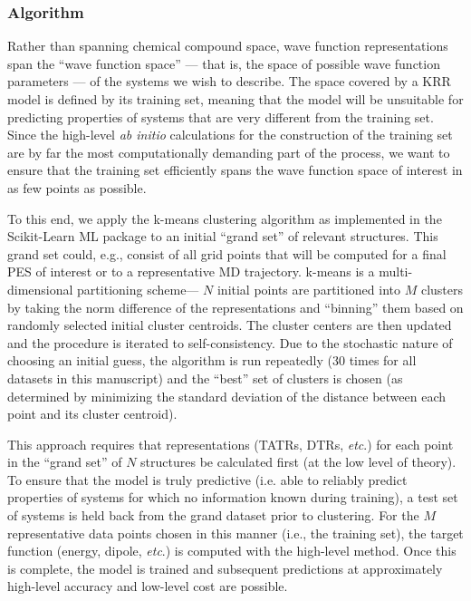 \subsubsection{Algorithm} \label{algorithm}
Rather than spanning chemical compound space, wave function representations span the ``wave function space'' --- that is, the space of possible wave function parameters --- of the systems we wish to describe. The space covered by a KRR model is defined by its training set, meaning that the model will be unsuitable for predicting properties of systems that are very different from the training set. Since the high-level \emph{ab initio} calculations for the construction of the training set are by far the most computationally demanding part of the process, we want to ensure that the training set efficiently spans the wave function space of interest in as few points as possible. 

To this end, we apply the k-means clustering algorithm as implemented in the Scikit-Learn ML package\cite{Pedregosa2011} to an initial ``grand set'' of relevant structures. This grand set could, e.g., consist of all grid points that will be computed for a final PES of interest or to a representative MD trajectory. k-means is a multi-dimensional partitioning scheme--- $N$ initial points are partitioned into $M$ clusters by taking the norm difference of the representations and ``binning'' them based on randomly selected initial cluster centroids. 
The cluster centers are then updated and the procedure is iterated to self-consistency. Due to the stochastic nature of choosing an initial guess, the algorithm is run repeatedly (30 times for all datasets in this manuscript) and the ``best'' set of clusters is chosen (as determined by minimizing the standard deviation of the distance between each point and its cluster centroid).

This approach requires that representations (TATRs, DTRs, \textit{etc}.) for each point in the ``grand set'' of $N$ structures be calculated first (at the low level of theory). To ensure that the model is truly predictive (i.e. able to reliably predict properties of systems for which no information known during training), a test set of systems is held back from the grand dataset prior to clustering.
For the $M$ representative data points chosen in this manner (i.e., the training set), the target function (energy, dipole, \textit{etc}.) is computed with the high-level method. Once this is complete, the model is trained and subsequent predictions at approximately high-level accuracy and low-level cost are possible.


